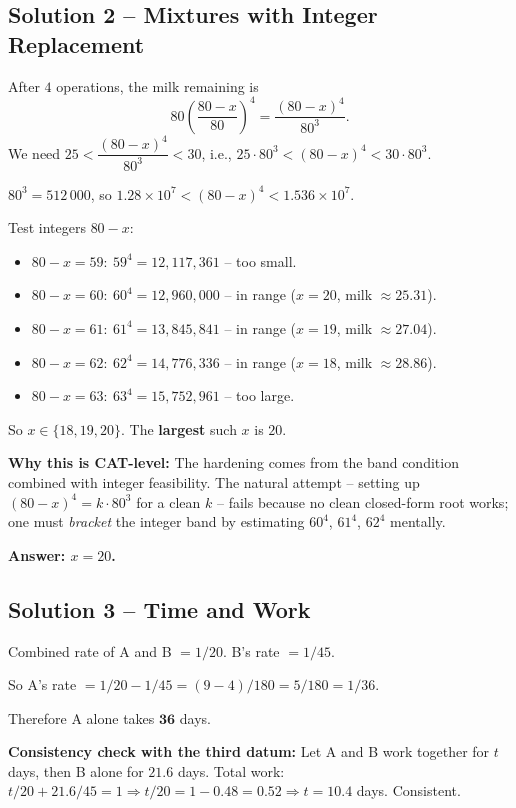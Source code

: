 \documentclass[11pt,a4paper]{article}
\begin{document}
\medskip

\subsection*{Solution 2 -- Mixtures with Integer Replacement}
After $4$ operations, the milk remaining is
\[
80\!\left(\frac{80-x}{80}\right)^{4}=\frac{(80-x)^{4}}{80^{3}}.
\]
We need $25<\dfrac{(80-x)^{4}}{80^{3}}<30$, i.e., $25\cdot 80^{3}<(80-x)^{4}<30\cdot 80^{3}.$

$80^3 = 512\,000$, so $1.28\times 10^{7}<(80-x)^{4}<1.536\times 10^{7}.$

Test integers $80-x$:
\begin{itemize}[leftmargin=*,itemsep=0pt]
  \item $80-x=59:\ 59^{4}=12{,}117{,}361$ -- too small.
  \item $80-x=60:\ 60^{4}=12{,}960{,}000$ -- in range ($x=20$, milk $\approx 25.31$).
  \item $80-x=61:\ 61^{4}=13{,}845{,}841$ -- in range ($x=19$, milk $\approx 27.04$).
  \item $80-x=62:\ 62^{4}=14{,}776{,}336$ -- in range ($x=18$, milk $\approx 28.86$).
  \item $80-x=63:\ 63^{4}=15{,}752{,}961$ -- too large.
\end{itemize}

So $x\in\{18,19,20\}$. The \textbf{largest} such $x$ is $\boxed{20}$.

\textbf{Why this is CAT-level:} The hardening comes from the band condition combined with integer feasibility. The natural attempt -- setting up $(80-x)^4 = k\cdot 80^3$ for a clean $k$ -- fails because no clean closed-form root works; one must \emph{bracket} the integer band by estimating $60^4$, $61^4$, $62^4$ mentally.

\textbf{Answer: $x = 20$.}

\medskip

\subsection*{Solution 3 -- Time and Work}
Combined rate of A and B $=1/20$. B's rate $=1/45$.

So A's rate $=1/20 - 1/45 = (9-4)/180 = 5/180 = 1/36.$

Therefore A alone takes $\mathbf{36}$ days.

\textbf{Consistency check with the third datum:} Let A and B work together for $t$ days, then B alone for $21.6$ days. Total work: $t/20 + 21.6/45 = 1 \Rightarrow t/20 = 1 - 0.48 = 0.52 \Rightarrow t = 10.4$ days. Consistent.
\end{document}
